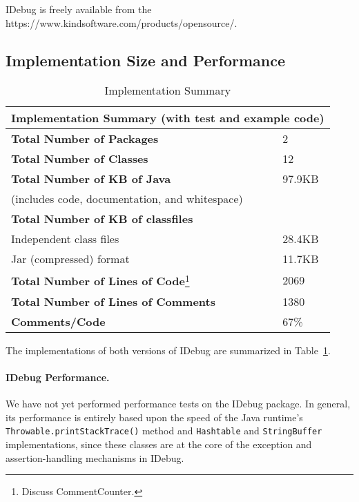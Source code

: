 \documentclass{article}
\begin{document}
IDebug is freely available from the 
{https://www.kindsoftware.com/products/opensource/}.

\subsection{Implementation Size and Performance}

\begin{table}[htbp]
  \begin{center}
    \begin{tabular}{|l|l|}
      \hline
      \multicolumn{2}{|c|}{Implementation Summary (with test and
        example code)}
      \\ \hline\hline
      \textbf{Total Number of Packages} & 2 \\ \hline
      \textbf{Total Number of Classes} & 12 \\ \hline
      \textbf{Total Number of KB of Java} & 97.9KB \\
      (includes code, documentation, and whitespace) & \\ \hline
      \textbf{Total Number of KB of classfiles} & \\
      Independent class files & 28.4KB \\
      Jar (compressed) format & 11.7KB \\ \hline
      \textbf{Total Number of Lines of Code}\footnote{Discuss 
        CommentCounter.} & 2069 \\ \hline
      \textbf{Total Number of Lines of Comments} & 1380 \\ \hline
      \textbf{Comments/Code} & 67\% \\ \hline
    \end{tabular}
    \caption{Implementation Summary}
    \label{tab:impl_summary}
  \end{center}
\end{table}

The implementations of both versions of IDebug are summarized in
Table~\ref{tab:impl_summary}.

\paragraph{IDebug Performance.} 
We have not yet performed performance tests on the IDebug package.  In
general, its performance is entirely based upon the speed of the Java
runtime's \texttt{Throwable.printStackTrace()} method and
\texttt{Hashtable} and \texttt{StringBuffer} implementations, since
these classes are at the core of the exception and assertion-handling
mechanisms in IDebug.
\end{document}
